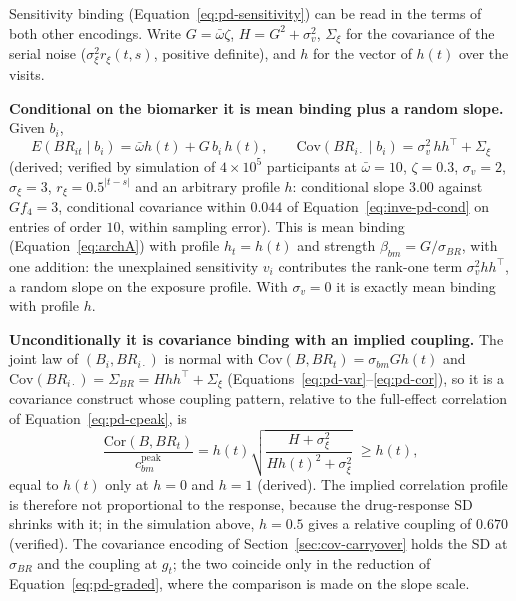 \documentclass[11pt]{article}
\begin{document}
Sensitivity binding (Equation~\eqref{eq:pd-sensitivity}) can be read in
the terms of both other encodings. Write $G = \bar\omega\zeta$,
$H = G^2 + \sigma_v^2$, $\Sigma_\xi$ for the covariance of the serial
noise ($\sigma_\xi^2 r_\xi(t,s)$, positive definite), and $h$ for the
vector of $h(t)$ over the visits.

\textbf{Conditional on the biomarker it is mean binding plus a random
slope.} Given $b_i$,
\begin{equation}
E(BR_{it} \mid b_i) = \bar\omega h(t) + G\, b_i\, h(t), \qquad
\mathrm{Cov}(BR_{i\cdot} \mid b_i) = \sigma_v^2\, h h^\top + \Sigma_\xi
\label{eq:inve-pd-cond}
\end{equation}
(derived; verified by simulation of $4\times10^5$ participants at
$\bar\omega = 10$, $\zeta = 0.3$, $\sigma_v = 2$, $\sigma_\xi = 3$,
$r_\xi = 0.5^{|t-s|}$ and an arbitrary profile $h$: conditional slope
$3.00$ against $Gf_4 = 3$, conditional covariance within $0.044$ of
Equation~\eqref{eq:inve-pd-cond} on entries of order $10$, within
sampling error). This is mean binding (Equation~\eqref{eq:archA}) with
profile $h_t = h(t)$ and strength $\beta_{bm} = G/\sigma_{BR}$, with one
addition: the unexplained sensitivity $v_i$ contributes the rank-one
term $\sigma_v^2 hh^\top$, a random slope on the exposure profile. With
$\sigma_v = 0$ it is exactly mean binding with profile $h$.

\textbf{Unconditionally it is covariance binding with an implied
coupling.} The joint law of $(B_i, BR_{i\cdot})$ is normal with
$\mathrm{Cov}(B, BR_t) = \sigma_{bm}Gh(t)$ and
$\mathrm{Cov}(BR_{i\cdot}) = \Sigma_{BR} = Hhh^\top + \Sigma_\xi$
(Equations~\eqref{eq:pd-var}--\eqref{eq:pd-cor}), so it is a covariance
construct whose coupling pattern, relative to the full-effect
correlation of Equation~\eqref{eq:pd-cpeak}, is
\begin{equation}
\frac{\mathrm{Cor}(B, BR_t)}{c_{bm}^{\mathrm{peak}}}
= h(t)\sqrt{\frac{H + \sigma_\xi^2}{Hh(t)^2 + \sigma_\xi^2}}
\;\ge h(t),
\label{eq:inve-pd-coupling}
\end{equation}
equal to $h(t)$ only at $h = 0$ and $h = 1$ (derived). The implied
correlation profile is therefore not proportional to the response,
because the drug-response SD shrinks with it; in the simulation above,
$h = 0.5$ gives a relative coupling of $0.670$ (verified). The
covariance encoding of Section~\ref{sec:cov-carryover} holds the SD at
$\sigma_{BR}$ and the coupling at $g_t$; the two coincide only in the
reduction of Equation~\eqref{eq:pd-graded}, where the comparison is made
on the slope scale.
\end{document}
